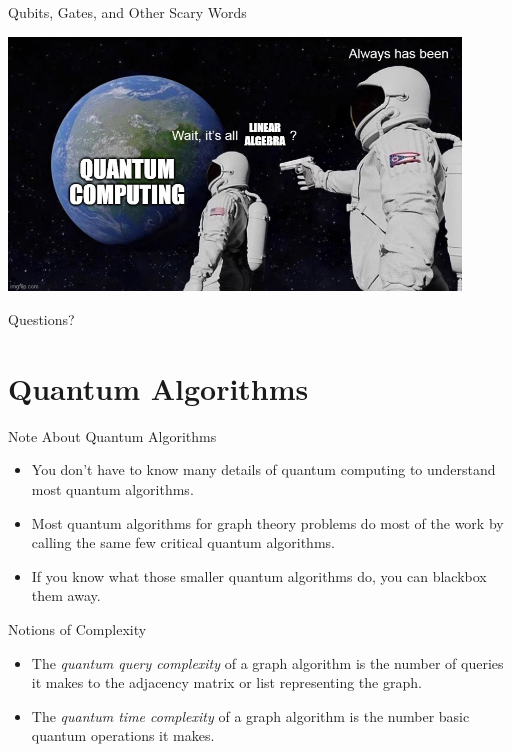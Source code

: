 \documentclass[aspectratio=169, handout]{beamer}
\begin{document}
\begin{frame}{Qubits, Gates, and Other Scary Words}
\begin{center}
    \includegraphics[width=120mm]{QCLA.jpg}
\end{center}
\end{frame}

\begin{frame}{}
      \begin{center}
    {\color{sigma@mainblue} \LARGE Questions?}
  \end{center}
\end{frame}

\section{Quantum Algorithms}
\frame{\sectionpage}

\begin{frame}{Note About Quantum Algorithms}
\begin{itemize}
    \item You don't have to know many details of quantum computing to understand most quantum algorithms. \pause
    \item Most quantum algorithms for graph theory problems do most of the work by calling the same few critical quantum algorithms. \pause
    \item If you know what those smaller quantum algorithms do, you can blackbox them away.
\end{itemize}
\end{frame}

\begin{frame}{Notions of Complexity}
\begin{itemize}
    \item The \emph{quantum query complexity} of a graph algorithm is the number of queries it makes to the adjacency matrix or list representing the graph. \pause
    \item The \emph{quantum time complexity} of a graph algorithm is the number basic quantum operations it makes.
\end{itemize}
\end{frame}
\end{document}
